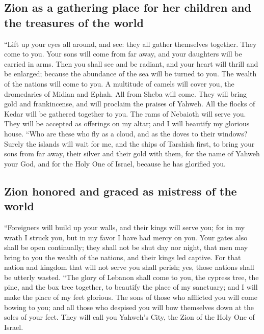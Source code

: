 \hypertarget{zion-as-a-gathering-place-for-her-children-and-the-treasures-of-the-world}{%
\subsection{Zion as a gathering place for her children and the treasures
of the
world}\label{zion-as-a-gathering-place-for-her-children-and-the-treasures-of-the-world}}

 ``Lift up your eyes all around, and see: they all gather
themselves together. They come to you. Your sons will come from far
away, and your daughters will be carried in arms.  Then
you shall see and be radiant, and your heart will thrill and be
enlarged; because the abundance of the sea will be turned to you. The
wealth of the nations will come to you.  A multitude of
camels will cover you, the dromedaries of Midian and Ephah. All from
Sheba will come. They will bring gold and frankincense, and will
proclaim the praises of Yahweh.  All the flocks of Kedar
will be gathered together to you. The rams of Nebaioth will serve you.
They will be accepted as offerings on my altar; and I will beautify my
glorious house.  ``Who are these who fly as a cloud, and
as the doves to their windows?  Surely the islands will
wait for me, and the ships of Tarshish first, to bring your sons from
far away, their silver and their gold with them, for the name of Yahweh
your God, and for the Holy One of Israel, because he has glorified you.

\hypertarget{zion-honored-and-graced-as-mistress-of-the-world}{%
\subsection{Zion honored and graced as mistress of the
world}\label{zion-honored-and-graced-as-mistress-of-the-world}}

 ``Foreigners will build up your walls, and their kings
will serve you; for in my wrath I struck you, but in my favor I have had
mercy on you.  Your gates also shall be open continually;
they shall not be shut day nor night, that men may bring to you the
wealth of the nations, and their kings led captive.  For
that nation and kingdom that will not serve you shall perish; yes, those
nations shall be utterly wasted.  ``The glory of Lebanon
shall come to you, the cypress tree, the pine, and the box tree
together, to beautify the place of my sanctuary; and I will make the
place of my feet glorious.  The sons of those who
afflicted you will come bowing to you; and all those who despised you
will bow themselves down at the soles of your feet. They will call you
Yahweh's City, the Zion of the Holy One of Israel.

